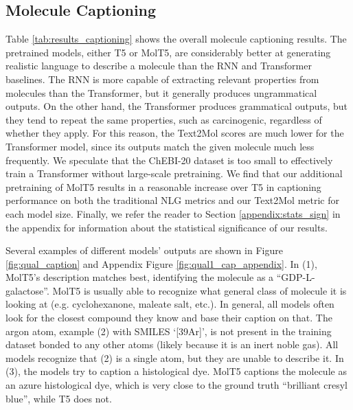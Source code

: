 \subsection{Molecule Captioning}


Table \ref{tab:results_captioning} shows the overall molecule captioning results. The pretrained models, either T5 or MolT5, are considerably better at generating realistic language to describe a molecule than the RNN and Transformer baselines. The RNN is more capable of extracting relevant properties from molecules than the Transformer, but it generally produces ungrammatical outputs. On the other hand, the Transformer produces grammatical outputs, but they tend to repeat the same properties, such as carcinogenic, regardless of whether they apply. For this reason, the Text2Mol scores are much lower for the Transformer model, since its outputs match the given molecule much less frequently. We speculate that the ChEBI-20 dataset is too small to effectively train a Transformer without large-scale pretraining. We find that our additional pretraining of MolT5 results in a reasonable increase over T5 in captioning performance on both the traditional NLG metrics and our Text2Mol metric for each model size. Finally, we refer the reader to Section \ref{appendix:stats_sign} in the appendix for information about the statistical significance of our results.

Several examples of different models' outputs are shown in Figure \ref{fig:qual_caption} and Appendix Figure \ref{fig:qual1_cap_appendix}. In (1), MolT5's description matches best, identifying the molecule as a ``GDP-L-galactose''. MolT5 is usually able to recognize what general class of molecule it is looking at (e.g. cyclohexanone, maleate salt, etc.). In general, all models often look for the closest compound they know and base their caption on that. The argon atom, example (2) with SMILES `[39Ar]', is not present in the training dataset bonded to any other atoms (likely because it is an inert noble gas). All models recognize that (2) is a single atom, but they are unable to describe it.
In (3), the models try to caption a histological dye. MolT5 captions the molecule as an azure histological dye, which is very close to the ground truth ``brilliant cresyl blue'', while T5 does not.



